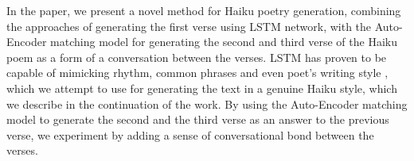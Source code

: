 \documentclass{acm_proc_article-sp}
\begin{document}
In the paper, we present a novel method for Haiku poetry generation, combining the approaches of generating the first verse using LSTM network, with the Auto-Encoder matching model \cite{luo2018autoencoder} for generating the second and third verse of the Haiku poem as a form of a conversation between the verses. LSTM has proven to be capable of mimicking rhythm, common phrases and even poet's writing style \cite{potash2015ghostwriter}, which we attempt to use for generating the text in a genuine Haiku style, which we describe in the continuation of the work. By using the Auto-Encoder matching model to generate the second and the third verse as an answer to the previous verse, we experiment by adding a sense of conversational bond between the verses.

%
%
\end{document}
